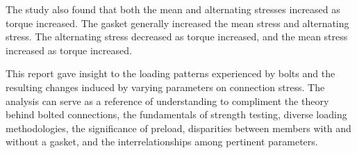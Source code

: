     The study also found that both the mean and alternating stresses increased as torque increased. The gasket generally increased the mean stress and alternating stress. The alternating stress decreased as torque increased, and the mean stress increased as torque increased.

    This report gave insight to the loading patterns experienced by bolts and the resulting changes induced by varying parameters on connection stress. The analysis can serve as a reference of understanding to compliment the theory behind bolted connections, the fundamentals of strength testing, diverse loading methodologies, the significance of preload, disparities between members with and without a gasket, and the interrelationships among pertinent parameters.
